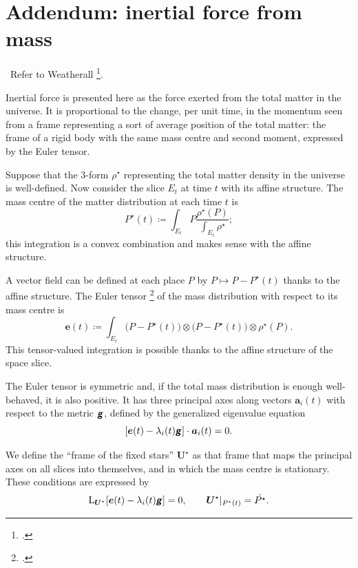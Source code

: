 \documentclass[\ifafour a4paper,12pt,\else a5paper,10pt,\fi%
onecolumn,oneside,article,%
british%
]{memoir}
\theoremstyle{remark}
\theoremstyle{innote}
\newcommand*{\mathte}[1]{\textbf{\textit{\textsf{#1}}}}
\newcommand*{\citep}{\footcites}%
\newcommand*{\citey}{\footcites}%
\newcommand*{\defd}{\coloneqq}
\renewcommand*{\|}{\nonscript\,\vert\nonscript\;\mathopen{}}
\newcommand*{\sect}{\S}%
\newcommand*{\puzzle}{{\fontencoding{U}\fontfamily{fontawesometwo}\selectfont\symbol{225}}}
\newcommand{\mynote}[1]{ {\color{notecolour}\puzzle\ #1}}
\newcommand*{\Li}{\mathrm{L}}
\newcommand*{\ydd}{\rho}
\newcommand*{\yd}{\ydd}
\newcommand*{\yrfs}{\yd^{\mathord{\star}}}
\newcommand*{\yP}{P}
\newcommand*{\yPc}{\yP^{\mathord{\star}}}
\newcommand*{\yEu}{E}
\newcommand*{\yeu}{\bm{e}}
\newcommand*{\yva}{\bm{a}}
\newcommand*{\yla}{\lambda}
\newcommand*{\yFF}{U}
\newcommand*{\yF}{\bm{\yFF}}
\newcommand*{\yFi}{\yF^{\mathord{\star}}}
\newcommand*{\ycfs}{\yFi}
\newcommand*{\ygg}{g}
\newcommand*{\yg}{\mathte{\ygg}}
\begin{document}
\appendix



\section{Addendum: inertial force from mass}
\label{sec:inertial_force}

\mynote{Refer to Weatherall \citey{weatherall2017}.}

Inertial force is presented here as the force exerted from the total matter
in the universe. It is proportional to the change, per unit time, in the
momentum seen from a frame representing a sort of average position of the
total matter: the frame of a rigid body with the same mass centre and
second moment, expressed by the Euler tensor.


Suppose that the  3-form $\yrfs$ representing the total matter density in the
universe is well-defined. Now consider the slice $\yEu_t$ at time $t$ with its
affine structure. The mass centre of the matter distribution at each time $t$ is
\begin{equation}
  \label{eq:mass_centre}
  \yPc(t) \defd \int_{\yEu_t} \yP \frac{\yrfs(\yP)}{\int_{\yEu_t}\yrfs};
\end{equation}
this integration is a convex combination and makes sense with the affine
structure. %

A vector field can be defined at each place $\yP$ by
$\yP\mapsto \yP-\yPc(t)$ thanks to the affine structure. The Euler tensor
\citep[\sect~I.10]{truesdell1977_r1991} of the mass distribution with
respect to its mass centre is
\begin{equation}
  \label{eq:euler_univ}
  \yeu(t) \defd \int_{\yEu_t}
  \bigl(\yP -\yPc(t)\bigr)\otimes \bigl(\yP-\yPc(t)\bigr)
  \otimes \yrfs(\yP).
\end{equation}
This tensor-valued integration is possible thanks to the affine structure
of the space slice.

The Euler tensor is symmetric and, if the total mass distribution is enough
well-behaved, it is also positive. It has three principal axes along
vectors $\yva_i(t)$ with respect to the metric $\yg$, defined by the
generalized eigenvalue equation
\begin{equation}
  \label{eq:principal_axes_euler}
  [\yeu(t) - \yla_i(t) \yg] \cdot \yva_i(t) = 0.
\end{equation}

We define the \enquote{frame of the fixed stars} $\yFi$ as that frame that maps
the principal axes on all slices into themselves, and in which the mass
centre is stationary. These conditions are expressed by
\begin{equation}
  \label{eq:defin_fixed-star_frame}
  \Li_{\yFi}[\yeu(t) - \yla_i(t) \yg]=0,\qquad
  \yFi\rvert_{\yPc(t)}=\Dot{\yPc}.
\end{equation}
\end{document}
